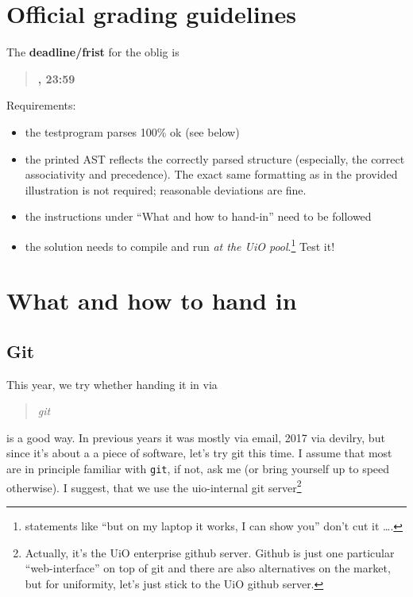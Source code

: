\documentclass[11pt,freeform]{handout}[2014/08/13]
\begin{document}
\thispagestyle{empty}

\section{Official grading guidelines}
\label{sec:official-info}




\hrulefill{}

The \textbf{deadline/frist}  for the oblig is

\begin{quote}
  \textbf{\deadlineone, 23:59}
\end{quote}

Requirements:


\begin{itemize}
\item the testprogram parses 100\% ok (see below)
\item the printed AST reflects the correctly parsed structure (especially,
  the correct associativity and precedence). The exact same formatting as
  in the provided illustration is not required; reasonable deviations are
  fine.
\item the instructions under ``What and how to  hand-in'' need to be followed
\item the solution needs to compile and run \emph{at the UiO
    pool}.\footnote{statements like ``but on my laptop it works, I can show
    you'' don't cut it \ldots.} Test it!
\end{itemize}

\hrulefill




\section{What and how to hand in}
\label{sec:what-how}


\subsection{Git}
\label{sec:git}



This year, we try whether handing it in via 
\begin{quote}
  \textsl{git}   
\end{quote}
is a good way. In previous years it was mostly via email, 2017 via devilry,
but since it's about a a piece of software, let's try git this time.  I
assume that most are in principle familiar with \texttt{git}, if not, ask
me (or bring yourself up to speed otherwise).  I suggest, that we use the
uio-internal git server\footnote{Actually, it's the UiO enterprise github
  server. Github is just one particular ``web-interface'' on top of git and
  there are also alternatives on the market, but for uniformity, let's just
  stick to the UiO github server.}
\end{document}
